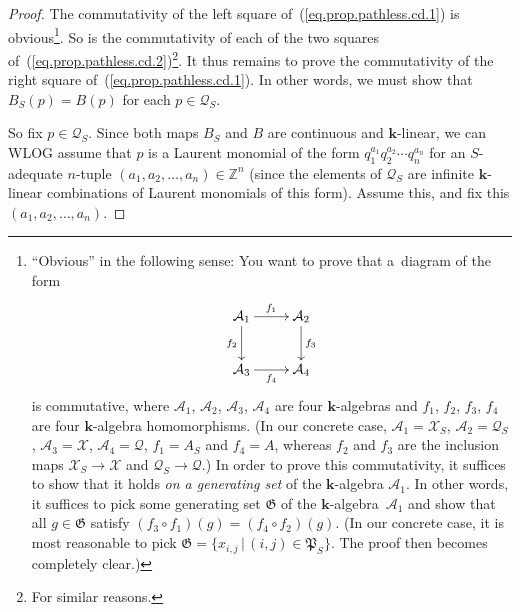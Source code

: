 \documentclass[11pt]{article}
\numberwithin{equation}{section}
\begin{document}
\begin{proof}The commutativity of the left square of~(\ref{eq.prop.pathless.cd.1}) is obvious\footnote{``Obvious'' in the following sense: You want to prove that a~diagram of the form
\begin{gather*}
\xymatrix{
\mathcal{A}_1 \ar[r]^{f_1} \ar[d]_{f_2} & \mathcal{A}_2 \ar[d]^{f_3} \\
\mathcal{A}_3 \ar[r]_{f_4} & \mathcal{A}_4
}
\end{gather*}
is commutative, where $\mathcal{A}_{1}$, $\mathcal{A}_{2}$, $\mathcal{A}_{3}$, $\mathcal{A}_{4}$ are four $\mathbf{k}$-algebras and $f_{1}$, $f_{2}$, $f_{3}$, $f_{4}$ are four $\mathbf{k}$-algebra homomorphisms. (In our concrete case, $\mathcal{A}_{1}=\mathcal{X}_{S}$, $\mathcal{A}_{2}=\mathcal{Q}_{S}$, $\mathcal{A}_{3}=\mathcal{X}$, $\mathcal{A}_{4}=\mathcal{Q}$, $f_{1}=A_{S}$ and $f_{4}=A$, whereas $f_{2}$ and $f_{3}$ are the inclusion maps $\mathcal{X}_{S}\rightarrow\mathcal{X}$ and $\mathcal{Q}_{S}\rightarrow \mathcal{Q}$.) In order to prove this commutativity, it suffices to show that it holds \textit{on a generating set} of the $\mathbf{k}$-algebra
$\mathcal{A}_{1}$. In other words, it suffices to pick some generating set $\mathfrak{G}$ of the $\mathbf{k}$-algebra~$\mathcal{A}_{1}$ and show that all $g\in\mathfrak{G}$ satisfy $( f_{3}\circ f_{1}) ( g)= ( f_{4}\circ f_{2} ) ( g ) $. (In our concrete case, it is most reasonable to pick $\mathfrak{G}= \{ x_{i,j}\,|\, (i,j ) \in\mathfrak{P}_{S} \} $. The proof then becomes completely clear.)}. So is the commutativity of each of the two squares of~(\ref{eq.prop.pathless.cd.2})\footnote{For similar reasons.}. It thus remains to prove the commutativity of the right square of~(\ref{eq.prop.pathless.cd.1}). In other words, we must show that $B_{S}(p) =B(p) $ for each $p\in\mathcal{Q}_{S}$.

So fix $p\in\mathcal{Q}_{S}$. Since both maps $B_{S}$ and $B$ are continuous and $\mathbf{k}$-linear, we can WLOG assume that $p$ is a Laurent monomial of the form $q_{1}^{a_{1}}q_{2}^{a_{2}}\cdots q_{n}^{a_{n}}$ for an $S$-adequate $n$-tuple $( a_{1},a_{2},\ldots,a_{n}) \in\mathbb{Z}^{n}$ (since the elements of $\mathcal{Q}_{S}$ are infinite $\mathbf{k}$-linear combinations of Laurent monomials of this form). Assume this, and fix this
$ ( a_{1},a_{2},\ldots,a_{n} ) $.


\end{proof}
\end{document}
